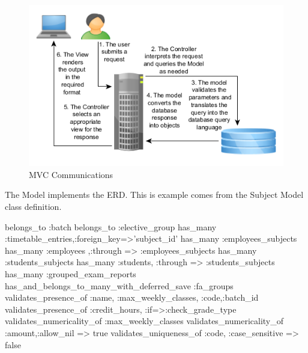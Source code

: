 \documentclass[]{book}
\newenvironment{Shaded}{\begin{snugshade}}{\end{snugshade}}
\newcommand{\DecValTok}[1]{\textcolor[rgb]{0.00,0.00,0.81}{#1}}
\newcommand{\NormalTok}[1]{#1}
\newcommand{\StringTok}[1]{\textcolor[rgb]{0.31,0.60,0.02}{#1}}
\begin{document}
\begin{figure}
\centering
\includegraphics{images/mvc.png}
\caption{MVC Communications}
\end{figure}

The Model implements the ERD. This is example comes from the Subject Model class definition.

\begin{Shaded}
\begin{Highlighting}[]
\NormalTok{belongs_to }\StringTok{:batch}
\NormalTok{belongs_to }\StringTok{:elective_group}
\NormalTok{has_many }\StringTok{:timetable_entries}\NormalTok{,}\StringTok{:foreign_key=}\NormalTok{>}\StringTok{'subject_id'}
\NormalTok{has_many }\StringTok{:employees_subjects}
\NormalTok{has_many }\StringTok{:employees}\NormalTok{ ,}\StringTok{:through}\NormalTok{ => }\StringTok{:employees_subjects}
\NormalTok{has_many }\StringTok{:students_subjects}
\NormalTok{has_many }\StringTok{:students}\NormalTok{, }\StringTok{:through}\NormalTok{ => }\StringTok{:students_subjects}
\NormalTok{has_many }\StringTok{:grouped_exam_reports}
\NormalTok{has_and_belongs_to_many_with_deferred_save }\StringTok{:fa_groups}
\NormalTok{validates_presence_of }\StringTok{:name}\NormalTok{, }\StringTok{:max_weekly_classes}\NormalTok{, }\StringTok{:code}\NormalTok{,}\StringTok{:batch_id}
\NormalTok{validates_presence_of }\StringTok{:credit_hours}\NormalTok{,}
   \StringTok{:if=}\NormalTok{>}\StringTok{:check_grade_type}
\NormalTok{validates_numericality_of }\StringTok{:max_weekly_classes}
\NormalTok{validates_numericality_of }\StringTok{:amount}\NormalTok{,}\StringTok{:allow_nil}\NormalTok{ => }\DecValTok{true}
\NormalTok{validates_uniqueness_of }\StringTok{:code}\NormalTok{, }\StringTok{:case_sensitive}\NormalTok{ => }\DecValTok{false}
\end{Highlighting}
\end{Shaded}
\end{document}

